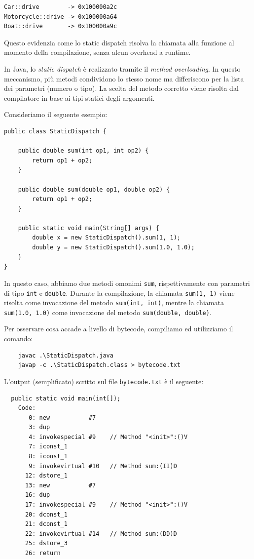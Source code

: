 \begin{verbatim}
Car::drive        -> 0x100000a2c
Motorcycle::drive -> 0x100000a64
Boat::drive       -> 0x100000a9c
\end{verbatim}

Questo evidenzia come lo static dispatch risolva la chiamata alla funzione al momento della compilazione, senza alcun overhead a runtime. 

In Java, lo \textit{static dispatch} è realizzato tramite il \textit{method overloading}. In questo meccanismo, più metodi condividono lo stesso nome ma differiscono per la lista dei parametri (numero o tipo). La scelta del metodo corretto viene risolta dal compilatore in base ai tipi statici degli argomenti.

Consideriamo il seguente esempio:

\begin{verbatim}
public class StaticDispatch {
		
    public double sum(int op1, int op2) {
        return op1 + op2;
    }
	
    public double sum(double op1, double op2) {
        return op1 + op2;
    }
	
    public static void main(String[] args) {
        double x = new StaticDispatch().sum(1, 1);
        double y = new StaticDispatch().sum(1.0, 1.0);
    }
}
\end{verbatim}

In questo caso, abbiamo due metodi omonimi \texttt{sum}, rispettivamente con parametri di tipo \texttt{int} e \texttt{double}. Durante la compilazione, la chiamata \texttt{sum(1, 1)} viene risolta come invocazione del metodo \texttt{sum(int, int)}, mentre la chiamata \texttt{sum(1.0, 1.0)} come invocazione del metodo \texttt{sum(double, double)}.  

Per osservare cosa accade a livello di bytecode, compiliamo ed utilizziamo il comando:

\begin{verbatim}
    javac .\StaticDispatch.java
    javap -c .\StaticDispatch.class > bytecode.txt
\end{verbatim}

L'output (semplificato) scritto sul file \texttt{bytecode.txt} è il seguente:
\begin{verbatim}
  public static void main(int[]);
    Code:
       0: new           #7    
       3: dup
       4: invokespecial #9    // Method "<init>":()V
       7: iconst_1
       8: iconst_1
       9: invokevirtual #10   // Method sum:(II)D
      12: dstore_1
      13: new           #7    
      16: dup
      17: invokespecial #9    // Method "<init>":()V
      20: dconst_1
      21: dconst_1
      22: invokevirtual #14   // Method sum:(DD)D
      25: dstore_3
      26: return
\end{verbatim}

